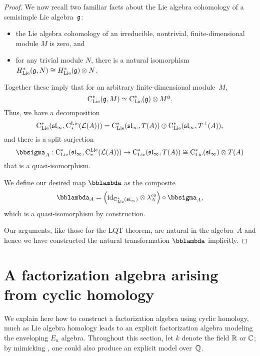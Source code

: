 \documentclass[11pt]{amsart}
\numberwithin{equation}{section}
\begin{document}
\begin{proof}
We now recall two familiar facts about the Lie algebra cohomology of a semisimple Lie algebra~$\mathfrak g$:
\begin{itemize}
\item the Lie algebra cohomology of an irreducible, nontrivial, finite-dimensional module $M$ is zero, and
\item for any trivial module $N$, there is a natural isomorphism $H^*_{\rm Lie}( \mathfrak g,N) \cong H^*_{\rm Lie}(\mathfrak g) \otimes N$.
\end{itemize}
Together these imply that for an arbitrary finite-dimensional module~$M$,
\[
{\rm C}_{\rm Lie}^*(\mathfrak g,M) \simeq {\rm C}_{\rm Lie}^*(\mathfrak g) \otimes M^\mathfrak g.
\]
Thus, we have a decomposition
\[
{\rm C}_{\rm Lie}^*(\frak{sl}_\infty,{\rm C}^{\rm Lie}_*(\mathcal L(A))) = {\rm C}_{\rm Lie}^*(\frak{sl}_\infty,T(A)) \oplus {\rm C}_{\rm Lie}^*(\frak{sl}_\infty,T^\perp(A)), 
\]
and there is a split surjection
\[
\bbsigma_A: \clies(\sl_\infty,\cliels(\cL(A))) \to \clies(\sl_\infty,T(A)) \cong \clies(\sl_\infty) \otimes T(A) 
\]
that is a quasi-isomorphism.

We define our desired map $\lqt$ as the composite
\[
\lqt_A = \left(\id_{\clies(\sl_\infty)} \otimes \lambda^{co}_A \right) \circ \bbsigma_A,
\]
which is a quasi-isomorphism by construction.

Our arguments, like those for the LQT theorem, are natural in the algebra~$A$ and hence we have constructed the natural transformation $\lqt$ implicitly.
\end{proof}

\section{A factorization algebra arising from cyclic homology}

We explain here how to construct a factorization algebra using cyclic homology,
much as Lie algebra homology leads to an explicit factorization algebra modeling the enveloping $E_n$ algebra. 
Throughout this section, let $k$ denote the field $\mathbb R$ or $\mathbb C$; 
by mimicking \cite{Knudsen}, one could also produce an explicit model over~$\mathbb Q$.
\end{document}
